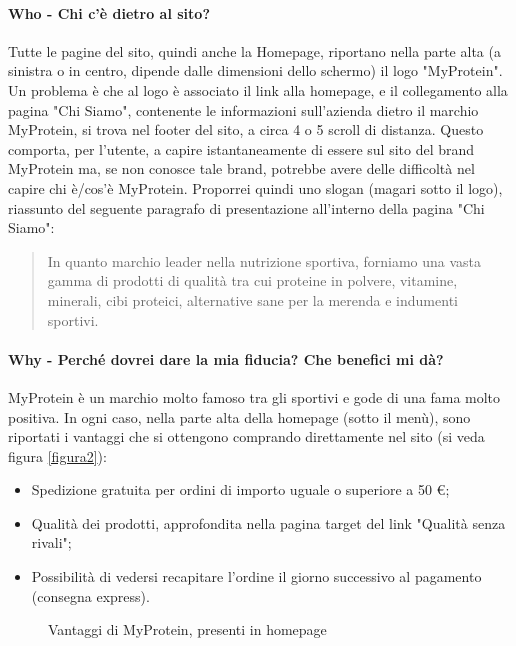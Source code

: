 \paragraph{Who - Chi c'è dietro al sito?}
Tutte le pagine del sito, quindi anche la Homepage, riportano nella parte alta (a sinistra o in centro, dipende dalle dimensioni dello schermo) il logo "MyProtein". Un problema è che al logo è associato il link alla homepage, e il collegamento alla pagina "Chi Siamo", contenente le informazioni sull'azienda dietro il marchio MyProtein, si trova nel footer del sito, a circa 4 o 5 scroll di distanza. Questo comporta, per l'utente, a capire istantaneamente di essere sul sito del brand MyProtein ma, se non conosce tale brand, potrebbe avere delle difficoltà nel capire chi è/cos'è MyProtein. Proporrei quindi uno slogan (magari sotto il logo), riassunto del seguente paragrafo di presentazione all'interno della pagina "Chi Siamo":
\begin{quote}
In quanto marchio leader nella nutrizione sportiva, forniamo una vasta gamma di prodotti di qualità tra cui proteine in polvere, vitamine, minerali, cibi proteici, alternative sane per la merenda e indumenti sportivi.
\end{quote}

\paragraph{Why - Perché dovrei dare la mia fiducia? Che benefici mi dà?}
MyProtein è un marchio molto famoso tra gli sportivi e gode di una fama molto positiva. In ogni caso, nella parte alta della homepage (sotto il menù), sono riportati i vantaggi che si ottengono comprando direttamente nel sito (si veda figura \ref{figura2}):
\begin{itemize}
	\item Spedizione gratuita per ordini di importo uguale o superiore a 50 \euro;
	\item Qualità dei prodotti, approfondita nella pagina target del link "Qualità senza rivali";
	\item Possibilità di vedersi recapitare l'ordine il giorno successivo al pagamento (consegna express).
\end{itemize}
\begin{figure}[!htb]
	\caption{\label{fig:figura2} Vantaggi di MyProtein, presenti in homepage}
\end{figure}
